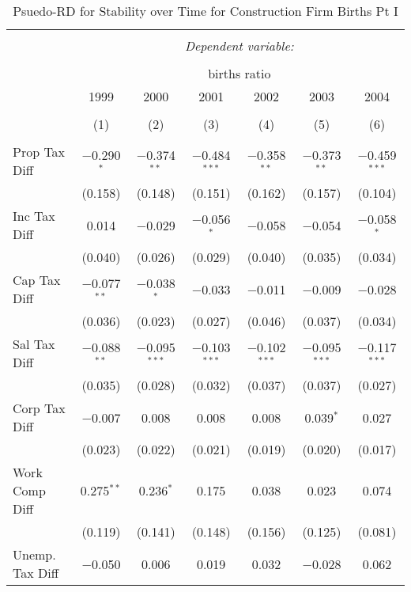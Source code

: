 
\begin{table}[!htbp] \centering 
  \caption{Psuedo-RD for Stability over Time for  Construction Firm Births Pt I} 
  \label{23year} 
\small 
\begin{tabular}{@{\extracolsep{5pt}}lcccccc} 
\\[-1.8ex]\hline 
\hline \\[-1.8ex] 
 & \multicolumn{6}{c}{\textit{Dependent variable:}} \\ 
\cline{2-7} 
\\[-1.8ex] & \multicolumn{6}{c}{births ratio} \\ 
 & 1999 & 2000 & 2001 & 2002 & 2003 & 2004 \\ 
\\[-1.8ex] & (1) & (2) & (3) & (4) & (5) & (6)\\ 
\hline \\[-1.8ex] 
 Prop Tax Diff & $-$0.290$^{*}$ & $-$0.374$^{**}$ & $-$0.484$^{***}$ & $-$0.358$^{**}$ & $-$0.373$^{**}$ & $-$0.459$^{***}$ \\ 
  & (0.158) & (0.148) & (0.151) & (0.162) & (0.157) & (0.104) \\ 
  Inc Tax Diff & 0.014 & $-$0.029 & $-$0.056$^{*}$ & $-$0.058 & $-$0.054 & $-$0.058$^{*}$ \\ 
  & (0.040) & (0.026) & (0.029) & (0.040) & (0.035) & (0.034) \\ 
  Cap Tax Diff & $-$0.077$^{**}$ & $-$0.038$^{*}$ & $-$0.033 & $-$0.011 & $-$0.009 & $-$0.028 \\ 
  & (0.036) & (0.023) & (0.027) & (0.046) & (0.037) & (0.034) \\ 
  Sal Tax Diff & $-$0.088$^{**}$ & $-$0.095$^{***}$ & $-$0.103$^{***}$ & $-$0.102$^{***}$ & $-$0.095$^{***}$ & $-$0.117$^{***}$ \\ 
  & (0.035) & (0.028) & (0.032) & (0.037) & (0.037) & (0.027) \\ 
  Corp Tax Diff & $-$0.007 & 0.008 & 0.008 & 0.008 & 0.039$^{*}$ & 0.027 \\ 
  & (0.023) & (0.022) & (0.021) & (0.019) & (0.020) & (0.017) \\ 
  Work Comp Diff & 0.275$^{**}$ & 0.236$^{*}$ & 0.175 & 0.038 & 0.023 & 0.074 \\ 
  & (0.119) & (0.141) & (0.148) & (0.156) & (0.125) & (0.081) \\ 
  Unemp. Tax Diff & $-$0.050 & 0.006 & 0.019 & 0.032 & $-$0.028 & 0.062 \\ 

\end{tabular}
\end{table}
